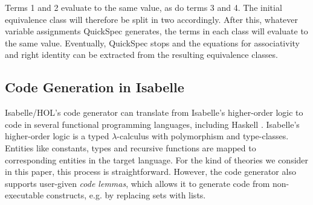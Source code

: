 \noindent Terms 1 and 2 evaluate to the same value, as do terms 3 and 4. The initial equivalence class will therefore be split in two accordingly.
After this, whatever variable assignments QuickSpec generates, the
terms in each class will evaluate to the same value. Eventually, QuickSpec stops and the equations for
associativity and right identity can be extracted from the resulting equivalence classes.

\subsection{Code Generation in Isabelle}
Isabelle/HOL's code generator can translate from Isabelle's higher-order logic to code in several functional programming languages, including Haskell \cite{codegen2,codegen}. Isabelle's higher-order logic is a typed $\lambda$-calculus with polymorphism and type-classes. 
Entities like constants, types and recursive functions are mapped to corresponding entities in the target language. For the kind of theories we consider in this paper, this process is straightforward. However, the code generator also supports user-given \emph{code lemmas}, which allows
it to generate code from non-executable constructs, e.g. by replacing sets with lists.

